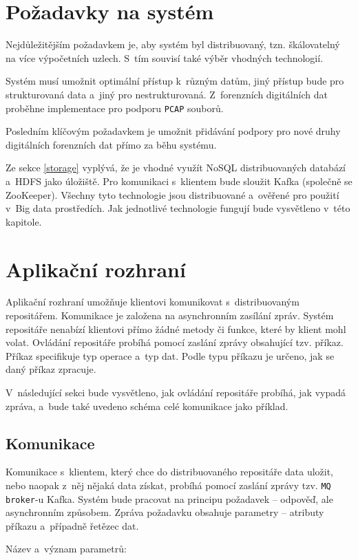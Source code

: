 \section{Požadavky na systém}
Nejdůležitějším požadavkem je, aby systém byl distribuovaný, tzn. škálovatelný na více výpočetních uzlech. S~tím souvisí také výběr vhodných technologií.

Systém musí umožnit optimální přístup k~různým datům, jiný přístup bude pro strukturovaná data a~jiný pro nestrukturovaná. Z~forenzních digitálních dat proběhne implementace pro podporu \texttt{PCAP} souborů.

Posledním klíčovým požadavkem je umožnit přidávání podpory pro nové druhy digitálních forenzních dat přímo za běhu systému.

Ze sekce \ref{storage} vyplývá, že je vhodné využít NoSQL distribuovaných databází a~HDFS jako úložiště. Pro komunikaci s~klientem bude sloužit Kafka (společně se ZooKeeper). Všechny tyto technologie jsou distribuované a~ověřené pro použití v~Big data prostředích. Jak jednotlivé technologie fungují bude vysvětleno v~této kapitole.

\section{Aplikační rozhraní}
Aplikační rozhraní umožňuje klientovi komunikovat s~distribuovaným repositářem. Komunikace je založena na asynchronním zasílání zpráv. Systém repositáře nenabízí klientovi přímo žádné metody či funkce, které by klient mohl volat. Ovládání repositáře probíhá pomocí zaslání zprávy obsahující tzv. příkaz. Příkaz specifikuje typ operace a~typ dat. Podle typu příkazu je určeno, jak se daný příkaz zpracuje.

V~následující sekci bude vysvětleno, jak ovládání repositáře probíhá, jak vypadá zpráva, a~bude také uvedeno schéma celé komunikace jako příklad.

\subsection{Komunikace} \label{designCommunication}
Komunikace s~klientem, který chce do distribuovaného repositáře data uložit, nebo naopak z~něj nějaká data získat, probíhá pomocí zaslání zprávy tzv. \texttt{MQ broker}-u Kafka. Systém bude pracovat na principu požadavek -- odpověď, ale asynchronním způsobem. Zpráva požadavku obsahuje parametry -- atributy příkazu a~případně řetězec dat.

\vspace{0.5cm}
\noindent Název a~význam parametrů:

